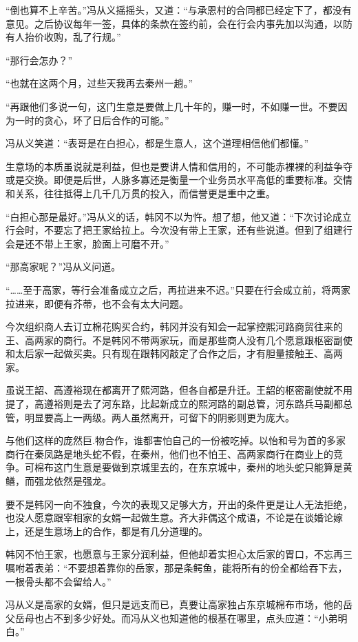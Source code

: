 “倒也算不上辛苦。”冯从义摇摇头，又道：“与承恩村的合同都已经定下了，都没有意见。之后协议每年一签，具体的条款在签约前，会在行会内事先加以沟通，以防有人抬价收购，乱了行规。”

“那行会怎办？”

“也就在这两个月，过些天我再去秦州一趟。”

“再跟他们多说一句，这门生意是要做上几十年的，赚一时，不如赚一世。不要因为一时的贪心，坏了日后合作的可能。”

冯从义笑道：“表哥是在白担心，都是生意人，这个道理相信他们都懂。”

生意场的本质虽说就是利益，但也是要讲人情和信用的，不可能赤裸裸的利益争夺或是交换。即便是后世，人脉多寡还是衡量一个业务员水平高低的重要标准。交情和关系，往往抵得上几千几万贯的投入，而信誉更是重中之重。

“白担心那是最好。”冯从义的话，韩冈不以为忤。想了想，他又道：“下次讨论成立行会时，不要忘了把王家给拉上。今次没有带上王家，还有些说道。但到了组建行会是还不带上王家，脸面上可磨不开。”

“那高家呢？”冯从义问道。

“……至于高家，等行会准备成立之后，再拉进来不迟。”只要在行会成立前，将两家拉进来，即便有芥蒂，也不会有太大问题。

今次组织商人去订立棉花购买合约，韩冈并没有知会一起掌控熙河路商贸往来的王、高两家的商行。不是韩冈不带两家玩，而是那些商人没有几个愿意跟枢密副使和太后家一起做买卖。只有现在跟韩冈敲定了合作之后，才有胆量接触王、高两家。

虽说王韶、高遵裕现在都离开了熙河路，但各自都是升迁。王韶的枢密副使就不用提了，高遵裕则是去了河东路，比起新成立的熙河路的副总管，河东路兵马副都总管，明显要高上一两级。两人虽然离开，可留下的阴影则更为庞大。

与他们这样的庞然巨.物合作，谁都害怕自己的一份被吃掉。以怡和号为首的多家商行在秦凤路是地头蛇不假，在秦州，他们也不怕王、高两家商行在商业上的竞争。可棉布这门生意是要做到京城里去的，在东京城中，秦州的地头蛇只能算是黄鳝，而强龙依然是强龙。

要不是韩冈一向不独食，今次的表现又足够大方，开出的条件更是让人无法拒绝，也没人愿意跟宰相家的女婿一起做生意。齐大非偶这个成语，不论是在谈婚论嫁上，还是生意场上的合作，都是有几分道理的。

韩冈不怕王家，也愿意与王家分润利益，但他却着实担心太后家的胃口，不忘再三嘱咐着表弟：“不要想着靠你的岳家，那是条鳄鱼，能将所有的份全都给吞下去，一根骨头都不会留给人。”

冯从义是高家的女婿，但只是远支而已，真要让高家独占东京城棉布市场，他的岳父岳母也占不到多少好处。而冯从义也知道他的根基在哪里，点头应道：“小弟明白。”

